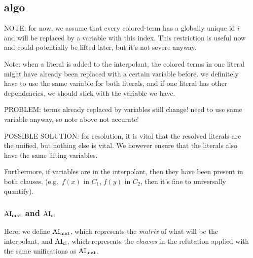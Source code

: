 \documentclass[,%
	paper=a4,%
	DIV12, %
	twoside=false,%
	liststotoc,
	bibtotoc,
	draft=false,%
	numbers=noendperiod
]{scrartcl}
\begin{document}
\subsection{algo}

NOTE: for now, we assume that every colored-term has a globally unique id $i$ and will be replaced by a variable with this index. 
This restriction is useful now and could potentially be lifted later, but it's not severe anyway.

Note: when a literal is added to the interpolant, the colored terms in one literal might have already been replaced with a certain variable before. we definitely have to use the same variable for both literals, and if one literal has other dependencies, we should stick with the variable we have.

PROBLEM: terms already replaced by variables still change! need to use same variable anyway, so note above not accurate!

POSSIBLE SOLUTION: for resolution, it is vital that the resolved literals are the unified, but nothing else is vital. We however ensure that the literals also have the same lifting variables.   

Furthermore, if variables are in the interpolant, then they have been present in both clauses, (e.g.~$f(x)$ in $C_1$, $f(y)$ in $C_2$, then it's fine to universally quantify).


\subsubsection{$\operatorname{AI}_\mathrm{mat}$ and $\operatorname{AI}_\mathrm{cl}$}

Here, we define $\operatorname{AI}_\mathrm{mat}$, which represents the \emph{matrix} of what will be the interpolant, and $\operatorname{AI}_\mathrm{cl}$, which represents the \emph{clauses} in the refutation applied with the same unifications as $\operatorname{AI}_\mathrm{mat}$.
\end{document}

